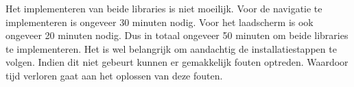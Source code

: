 Het implementeren van beide libraries is niet moeilijk. Voor de navigatie te implementeren 
is ongeveer 30 minuten nodig. Voor het laadscherm is ook ongeveer 20 minuten nodig. Dus in totaal 
ongeveer 50 minuten om beide libraries te implementeren. Het is wel belangrijk 
om aandachtig de installatiestappen te volgen. Indien dit niet gebeurt kunnen er gemakkelijk fouten optreden.
Waardoor tijd verloren gaat aan het oplossen van deze fouten.


